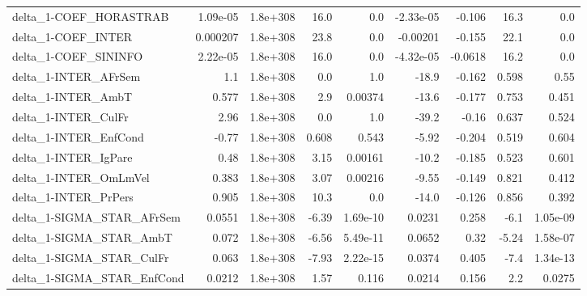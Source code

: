 \begin{tabular}{lrrrrrrrr}
delta\_1-COEF\_HORASTRAB                &    1.09e-05 &     1.8e+308 &    16.0 &      0.0 &  -2.33e-05 &      -0.106 &         16.3 &           0.0 \\
delta\_1-COEF\_INTER                    &    0.000207 &     1.8e+308 &    23.8 &      0.0 &   -0.00201 &      -0.155 &         22.1 &           0.0 \\
delta\_1-COEF\_SININFO                  &    2.22e-05 &     1.8e+308 &    16.0 &      0.0 &  -4.32e-05 &     -0.0618 &         16.2 &           0.0 \\
delta\_1-INTER\_AFrSem                  &         1.1 &     1.8e+308 &     0.0 &      1.0 &      -18.9 &      -0.162 &        0.598 &          0.55 \\
delta\_1-INTER\_AmbT                    &       0.577 &     1.8e+308 &     2.9 &  0.00374 &      -13.6 &      -0.177 &        0.753 &         0.451 \\
delta\_1-INTER\_CulFr                   &        2.96 &     1.8e+308 &     0.0 &      1.0 &      -39.2 &       -0.16 &        0.637 &         0.524 \\
delta\_1-INTER\_EnfCond                 &       -0.77 &     1.8e+308 &   0.608 &    0.543 &      -5.92 &      -0.204 &        0.519 &         0.604 \\
delta\_1-INTER\_IgPare                  &        0.48 &     1.8e+308 &    3.15 &  0.00161 &      -10.2 &      -0.185 &        0.523 &         0.601 \\
delta\_1-INTER\_OmLmVel                 &       0.383 &     1.8e+308 &    3.07 &  0.00216 &      -9.55 &      -0.149 &        0.821 &         0.412 \\
delta\_1-INTER\_PrPers                  &       0.905 &     1.8e+308 &    10.3 &      0.0 &      -14.0 &      -0.126 &        0.856 &         0.392 \\
delta\_1-SIGMA\_STAR\_AFrSem             &      0.0551 &     1.8e+308 &   -6.39 & 1.69e-10 &     0.0231 &       0.258 &         -6.1 &      1.05e-09 \\
delta\_1-SIGMA\_STAR\_AmbT               &       0.072 &     1.8e+308 &   -6.56 & 5.49e-11 &     0.0652 &        0.32 &        -5.24 &      1.58e-07 \\
delta\_1-SIGMA\_STAR\_CulFr              &       0.063 &     1.8e+308 &   -7.93 & 2.22e-15 &     0.0374 &       0.405 &         -7.4 &      1.34e-13 \\
delta\_1-SIGMA\_STAR\_EnfCond            &      0.0212 &     1.8e+308 &    1.57 &    0.116 &     0.0214 &       0.156 &          2.2 &        0.0275 \\

\end{tabular}
